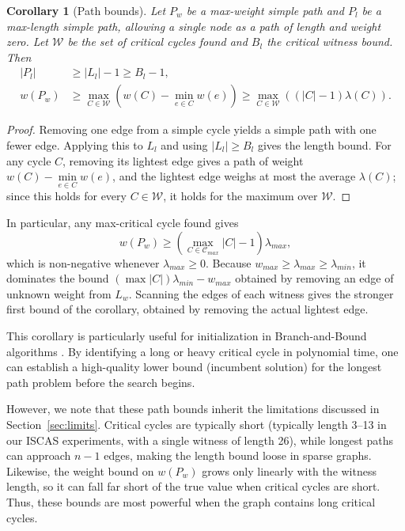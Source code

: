 \documentclass{article}
\newtheorem{cor}{Corollary}[section]
\theoremstyle{definition}
\begin{document}
\begin{cor}[Path bounds]
Let $P_w$ be a max-weight simple path and $P_l$ be a max-length simple
path, allowing a single node as a path of length and weight zero. Let
$\mathcal{W}$ be the set of critical cycles found and $B_l$ the
critical witness bound. Then
\begin{align}
    |P_l| &\geq |L_l| - 1 \geq B_l - 1, \\
    w(P_w) &\geq \max\limits_{C \in \mathcal{W}}
      \left( w(C) - \min\limits_{e \in C} w(e) \right)
      \geq \max\limits_{C \in \mathcal{W}} \left( (|C| - 1)\lambda(C) \right).
\end{align}
\end{cor}

\begin{proof}
Removing one edge from a simple cycle yields a simple path with one
fewer edge. Applying this to $L_l$ and using $|L_l| \geq B_l$ gives
the length bound. For any cycle $C$, removing its lightest edge gives
a path of weight $w(C) - \min\limits_{e \in C} w(e)$, and the lightest edge
weighs at most the average $\lambda(C)$; since this holds for every $C
\in \mathcal{W}$, it holds for the maximum over $\mathcal{W}$.
\end{proof}

In particular, any max-critical cycle found gives
\begin{equation}
    w(P_w) \geq (\max\limits_{C \in \mathcal{C}_{max}} |C| - 1) \lambda_{max},
\end{equation}
which is non-negative whenever $\lambda_{max} \geq 0$. Because
$w_{max} \geq \lambda_{max} \geq \lambda_{min}$, it dominates the
bound $(\max |C|)\lambda_{min} - w_{max}$ obtained by removing an
edge of unknown weight from $L_w$. Scanning the edges of each witness
gives the
stronger first bound of the corollary, obtained by removing the
actual lightest edge.

This corollary is particularly useful for initialization in
Branch-and-Bound algorithms \citep{MoJaSaSe16,StPuFe14,CoStFe20}. By
identifying a long or heavy critical cycle in polynomial time, one can
establish a high-quality lower bound (incumbent solution) for the
longest path problem before the search begins.

However, we note that these path bounds inherit the limitations
discussed in Section~\ref{sec:limits}. Critical cycles are typically
short (typically length 3--13 in our ISCAS experiments, with a single
witness of length 26), while longest paths can
approach $n-1$ edges, making the length bound loose in sparse
graphs. Likewise, the weight bound on $w(P_w)$ grows only linearly
with the witness length, so it can fall far short of the true value
when critical cycles are short. Thus, these bounds are most powerful
when the graph contains long critical cycles.
\end{document}

